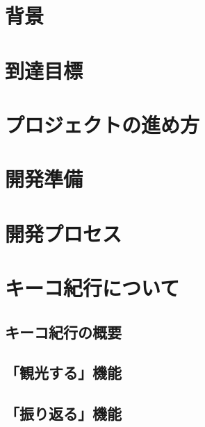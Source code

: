\documentclass[openany,11pt,papersize]{jsbook}
\begin{document}
%
\maketitle

\frontmatter



\tableofcontents%

\mainmatter%

\chapter{背景}


\chapter{到達目標}


\chapter{プロジェクトの進め方}


\chapter{開発準備}


\chapter{開発プロセス}





\chapter{キーコ紀行について}
\section{キーコ紀行の概要}

\section{「観光する」機能}




\section{「振り返る」機能}

\end{document}
